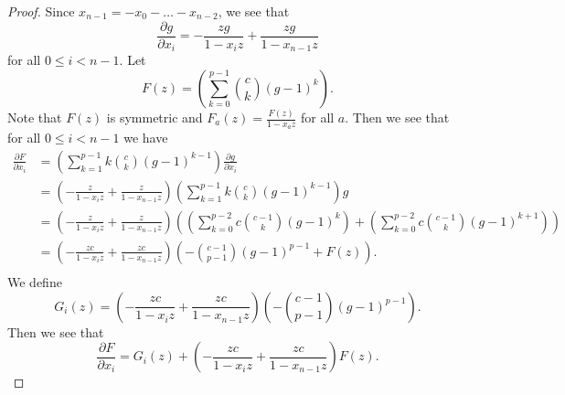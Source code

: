 \documentclass{article}
\numberwithin{equation}{section}
\begin{document}
\begin{proof}

Since $x_{n-1}=-x_0-\dots-x_{n-2}$, we see that $$\frac{\partial g}{\partial x_i}=-\frac{zg}{1-x_iz}+\frac{zg}{1-x_{n-1}z}$$ for all $0 \le i < n-1$. Let $$F(z) =\left(\sum_{k=0}^{p-1} \binom{c}{k} (g-1)^k\right).$$ Note that $F(z)$ is symmetric and $F_a(z)=\frac{F(z)}{1-x_az}$ for all $a$. Then we see that for all $0 \le i < n-1$ we have 
\begin{align*}
\frac{\partial F}{\partial x_i}%
&=\left(\sum_{k=1}^{p-1}k\binom{c}{k}(g-1)^{k-1}\right)\frac{\partial g}{\partial x_i}\\
&=\left(-\frac{z}{1-x_iz}+\frac{z}{1-x_{n-1}z}\right)\left(\sum_{k=1}^{p-1}k\binom{c}{k}(g-1)^{k-1}\right)g\\
&=\left(-\frac{z}{1-x_iz}+\frac{z}{1-x_{n-1}z}\right)\left(\left(\sum_{k=0}^{p-2}c\binom{c-1}{k}(g-1)^{k}\right)+\left(\sum_{k=0}^{p-2}c\binom{c-1}{k}(g-1)^{k+1}\right)\right)\\
&=\left(-\frac{zc}{1-x_iz}+\frac{zc}{1-x_{n-1}z}\right)\left(-\binom{c-1}{p-1}(g-1)^{p-1}+F(z)\right).\\
\end{align*}
We define $$G_i(z)=\left(-\frac{zc}{1-x_iz}+\frac{zc}{1-x_{n-1}z}\right)\left(-\binom{c-1}{p-1}(g-1)^{p-1}\right).$$ Then we see that $$\frac{\partial F}{\partial x_i}=G_i(z)+\left(-\frac{zc}{1-x_iz}+\frac{zc}{1-x_{n-1}z}\right)F(z).$$


\end{proof}
\end{document}
